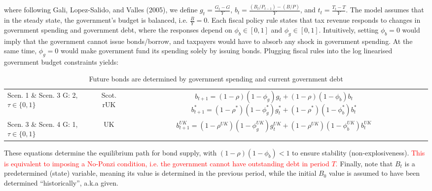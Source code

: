 where following Gali, Lopez-Salido, and Valles (2005), we define $g_t = \frac{G_t-G}{Y}$, $b_t = \frac{(B_t/P_{t-1}) - (B/P)}{Y}$, and $t_t = \frac{T_t - T}{Y}$. The model assumes that in the steady state, the government's budget is balanced, i.e. $\frac{B}{Y} = 0$. Each fiscal policy rule states that tax revenue responds to changes in government spending and government debt, where the responses depend on $\phi_b \in [0,1]$ and $\phi_g \in [0,1]$. Intuitively, setting $\phi_b = 0$ would imply that the government cannot issue bonds/borrow, and taxpayers would have to absorb any shock in government spending. At the same time, $\phi_g = 0$ would make government fund its spending solely by issuing bonds. Plugging fiscal rules into the log linearised government budget constraints yields:
\begin{table}[H]
    \renewcommand{\arraystretch}{2}
    \centering
    \begin{tabular}{l|c|c}
    \makecell{Scen. 1 \& Scen. 3\\ G: 2, $\tau \in \{0, 1\}$} & \makecell{Scot. \\ rUK } & 
        \makecell{
            $b_{t+1} = (1-\rho)(1-\phi_g) g_t + (1-\rho)(1-\phi_b)b_t$\\
            $b^*_{t+1} = (1-\rho^*)(1-\phi^*_g) g^*_t + (1-\rho^*)(1-\phi^*_b)b^*_t$
        }  \\ 
    \makecell{Scen. 3 \& Scen. 4\\ G: 1, $\tau \in \{0, 1\}$} & UK & 
    $b^{UK}_{t+1} = (1-\rho^{UK})(1-\phi^{UK}_g) g^{UK}_t + (1-\rho^{UK})(1-\phi^{UK}_b)b^{UK}_t$
    \end{tabular}
    \caption{Future bonds are determined by government spending and current government debt}
\end{table}
These equations determine the equilibrium path for bond supply, with \linebreak $(1-\rho)(1-\phi_b) < 1$ to ensure stability (non-explosiveness). \textcolor{red}{This is equivalent to imposing a No-Ponzi condition, i.e. the government cannot have outstanding debt in period $T$.} Finally, note that $B_t$ is a predetermined (state) variable, meaning its value is determined in the previous period, while the initial $B_0$ value is assumed to have been determined ``historically'', a.k.a given.